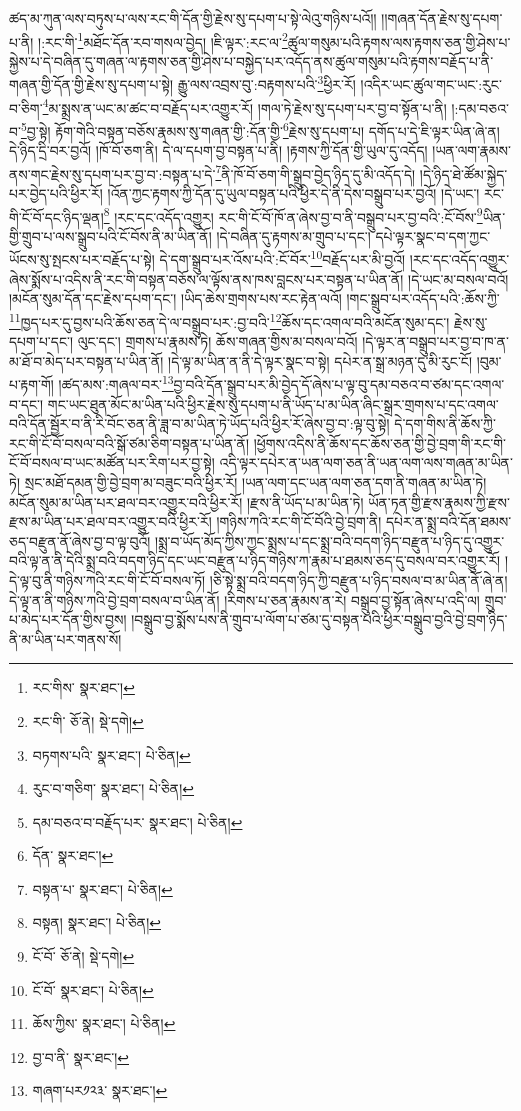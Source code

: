 ཚད་མ་ཀུན་ལས་བཏུས་པ་ལས་རང་གི་དོན་གྱི་རྗེས་སུ་དཔག་པ་སྟེ་ལེའུ་གཉིས་པའོ།། །།གཞན་དོན་རྗེས་སུ་དཔག་པ་ནི། །:རང་གི་\footnote{རང་གིས་  སྣར་ཐང་། }མཐོང་དོན་རབ་གསལ་བྱེད། །ཇི་ལྟར་:རང་ལ་\footnote{རང་གི་  ཅོ་ནེ།  སྡེ་དགེ། }ཚུལ་གསུམ་པའི་རྟགས་ལས་རྟགས་ཅན་གྱི་ཤེས་པ་སྐྱེས་པ་དེ་བཞིན་དུ་གཞན་ལ་རྟགས་ཅན་གྱི་ཤེས་པ་བསྐྱེད་པར་འདོད་ནས་ཚུལ་གསུམ་པའི་རྟགས་བརྗོད་པ་ནི་གཞན་གྱི་དོན་གྱི་རྗེས་སུ་དཔག་པ་སྟེ། རྒྱུ་ལས་འབྲས་བུ་:བརྟགས་པའི་\footnote{བཏགས་པའི་  སྣར་ཐང་།  པེ་ཅིན། }ཕྱིར་རོ། །འདིར་ཡང་ཚུལ་གང་ཡང་:རུང་བ་ཅིག་\footnote{རུང་བ་གཅིག་  སྣར་ཐང་།  པེ་ཅིན། }མ་སྨྲས་ན་ཡང་མ་ཚང་བ་བརྗོད་པར་འགྱུར་རོ། །གལ་ཏེ་རྗེས་སུ་དཔག་པར་བྱ་བ་སྟོན་པ་ནི། །:དམ་བཅའ་བ་\footnote{དམ་བཅའ་བ་བརྗོད་པར་  སྣར་ཐང་།  པེ་ཅིན། }བྱ་སྟེ། རྟོག་གེའི་བསྟན་བཅོས་རྣམས་སུ་གཞན་གྱི་:དོན་གྱི་\footnote{དོན་  སྣར་ཐང་། }རྗེས་སུ་དཔག་པ། དགོད་པ་དེ་ཇི་ལྟར་ཡིན་ཞེ་ན། དེ་ཉིད་དྲི་བར་བྱའོ། །ཁོ་བོ་ཅག་ནི། དེ་ལ་དཔག་བྱ་བསྟན་པ་ནི། །རྟགས་ཀྱི་དོན་གྱི་ཡུལ་དུ་འདོད། །ཡན་ལག་རྣམས་ནས་གང་རྗེས་སུ་དཔག་པར་བྱ་བ་:བསྟན་པ་དེ་\footnote{བསྟན་པ་  སྣར་ཐང་།  པེ་ཅིན། }ནི་ཁོ་བོ་ཅག་གི་སྒྲུབ་བྱེད་ཉིད་དུ་མི་འདོད་དེ། །དེ་ཉིད་ཐེ་ཚོམ་སྐྱེད་པར་བྱེད་པའི་ཕྱིར་རོ། །འོན་ཀྱང་རྟགས་ཀྱི་དོན་དུ་ཡུལ་བསྟན་པའི་ཕྱིར་དེ་ནི་དེས་བསྒྲུབ་པར་བྱའོ། །དེ་ཡང་། རང་གི་ངོ་བོ་དང་ཉིད་ལྡན།\footnote{བསྟན།  སྣར་ཐང་།  པེ་ཅིན། } །རང་དང་འདོད་འགྱུར། རང་གི་ངོ་བོ་ཁོ་ན་ཞེས་བྱ་བ་ནི་བསྒྲུབ་པར་བྱ་བའི་:ངོ་བོས་\footnote{ངོ་བོ་  ཅོ་ནེ།  སྡེ་དགེ། }ཡིན་གྱི་གྲུབ་པ་ལས་སྒྲུབ་པའི་ངོ་བོས་ནི་མ་ཡིན་ནོ། །དེ་བཞིན་དུ་རྟགས་མ་གྲུབ་པ་དང་། དཔེ་ལྟར་སྣང་བ་དག་ཀྱང་ཡོངས་སུ་སྤངས་པར་བརྗོད་པ་སྟེ། དེ་དག་སྒྲུབ་པར་འོས་པའི་:ངོ་བོར་\footnote{ངོ་བོ་  སྣར་ཐང་།  པེ་ཅིན། }བརྗོད་པར་མི་བྱའོ། །རང་དང་འདོད་འགྱུར་ཞེས་སྨོས་པ་འདིས་ནི་རང་གི་བསྟན་བཅོས་ལ་ལྟོས་ནས་ཁས་བླངས་པར་བསྟན་པ་ཡིན་ནོ། །དེ་ཡང་མ་བསལ་བའོ། །མངོན་སུམ་དོན་དང་རྗེས་དཔག་དང་། །ཡིད་ཆེས་གྲགས་པས་རང་རྟེན་ལའོ། །གང་སྒྲུབ་པར་འདོད་པའི་:ཆོས་ཀྱི་\footnote{ཆོས་ཀྱིས་  སྣར་ཐང་།  པེ་ཅིན། }ཁྱད་པར་དུ་བྱས་པའི་ཆོས་ཅན་དེ་ལ་བསྒྲུབ་པར་:བྱ་བའི་\footnote{བྱ་བ་ནི་  སྣར་ཐང་། }ཆོས་དང་འགལ་བའི་མངོན་སུམ་དང་། རྗེས་སུ་དཔག་པ་དང་། ལུང་དང་། གྲགས་པ་རྣམས་ཏེ། ཆོས་གཞན་གྱིས་མ་བསལ་བའོ། །དེ་ལྟར་ན་བསྒྲུབ་པར་བྱ་བ་ཁ་ན་མ་ཐོ་བ་མེད་པར་བསྟན་པ་ཡིན་ནོ། །དེ་ལྟ་མ་ཡིན་ན་ནི་དེ་ལྟར་སྣང་བ་སྟེ། དཔེར་ན་སྒྲ་མཉན་དུ་མི་རུང་ངོ། །བུམ་པ་རྟག་གོ། །ཚད་མས་:གཞལ་བར་\footnote{གཞག་པར༡༢༣་  སྣར་ཐང་། }བྱ་བའི་དོན་སྒྲུབ་པར་མི་བྱེད་དོ་ཞེས་པ་ལྟ་བུ་དམ་བཅའ་བ་ཙམ་དང་འགལ་བ་དང་། གང་ཡང་ཐུན་མོང་མ་ཡིན་པའི་ཕྱིར་རྗེས་སུ་དཔག་པ་ནི་ཡོད་པ་མ་ཡིན་ཞིང་སྒྲར་གྲགས་པ་དང་འགལ་བའི་དོན་སྦྱོར་བ་ནི་རི་བོང་ཅན་ནི་ཟླ་བ་མ་ཡིན་ཏེ་ཡོད་པའི་ཕྱིར་རོ་ཞེས་བྱ་བ་:ལྟ་བུ་སྟེ། དེ་དག་གིས་ནི་ཆོས་ཀྱི་རང་གི་ངོ་བོ་བསལ་བའི་སྒོ་ཙམ་ཅིག་བསྟན་པ་ཡིན་ནོ། །ཕྱོགས་འདིས་ནི་ཆོས་དང་ཆོས་ཅན་གྱི་བྱེ་བྲག་གི་རང་གི་ངོ་བོ་བསལ་བ་ཡང་མཚོན་པར་རིག་པར་བྱ་སྟེ། འདི་ལྟར་དཔེར་ན་ཡན་ལག་ཅན་ནི་ཡན་ལག་ལས་གཞན་མ་ཡིན་ཏེ། སྲང་མཐོ་དམན་གྱི་བྱེ་བྲག་མ་བཟུང་བའི་ཕྱིར་རོ། །ཡན་ལག་དང་ཡན་ལག་ཅན་དག་ནི་གཞན་མ་ཡིན་ཏེ། མངོན་སུམ་མ་ཡིན་པར་ཐལ་བར་འགྱུར་བའི་ཕྱིར་རོ། །རྫས་ནི་ཡོད་པ་མ་ཡིན་ཏེ། ཡོན་ཏན་གྱི་རྫས་རྣམས་ཀྱི་རྫས་རྫས་མ་ཡིན་པར་ཐལ་བར་འགྱུར་བའི་ཕྱིར་རོ། །གཉིས་ཀའི་རང་གི་ངོ་བོའི་བྱེ་བྲག་ནི། དཔེར་ན་སྨྲ་བའི་དོན་ཐམས་ཅད་བརྫུན་ནོ་ཞེས་བྱ་བ་ལྟ་བུའོ། །སྨྲ་བ་ཡོད་མོད་ཀྱིས་ཀྱང་སྨྲས་པ་དང་སྨྲ་བའི་བདག་ཉིད་བརྫུན་པ་ཉིད་དུ་འགྱུར་བའི་ལྟ་ན་ནི་དེའི་སྨྲ་བའི་བདག་ཉིད་དང་ཡང་བརྫུན་པ་ཉིད་གཉིས་ཀ་རྣམ་པ་ཐམས་ཅད་དུ་བསལ་བར་འགྱུར་རོ། །དེ་ལྟ་བུ་ནི་གཉིས་ཀའི་རང་གི་ངོ་བོ་བསལ་ཏོ། །ཅི་སྟེ་སྨྲ་བའི་བདག་ཉིད་ཀྱི་བརྫུན་པ་ཉིད་བསལ་བ་མ་ཡིན་ནོ་ཞེ་ན། དེ་ལྟ་ན་ནི་གཉིས་ཀའི་བྱེ་བྲག་བསལ་བ་ཡིན་ནོ། །རིགས་པ་ཅན་རྣམས་ན་རེ། བསྒྲུབ་བྱ་སྟོན་ཞེས་པ་འདི་ལ། གྲུབ་པ་མེད་པར་དོན་གྱིས་བྱས། །བསྒྲུབ་བྱ་སྨོས་པས་ནི་གྲུབ་པ་ལོག་པ་ཙམ་དུ་བསྟན་པའི་ཕྱིར་བསྒྲུབ་བྱའི་བྱེ་བྲག་ཉིད་ནི་མ་ཡིན་པར་གནས་སོ། 